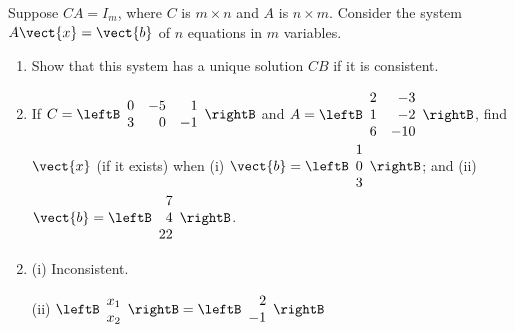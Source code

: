 \begin{multicols}{2}
\begin{ex}
\begin{sol}
\begin{enumerate}[label={\alph*.}]
\end{enumerate}
\end{sol}
\end{ex}

\begin{ex}
Suppose $CA = I_{m}$, where $C$ is $m \times n$ and $A$ is $n \times m$. Consider the system $A\vect{x} = \vect{b}$ of $n$ equations in $m$ variables.


\begin{enumerate}[label={\alph*.}]
\item Show that this system has a unique solution $CB$ if it is consistent.

\item If $C = \leftB \begin{array}{rrr}
0 & -5 & 1 \\
3 & 0 & -1
\end{array} \rightB$
 and $A = \leftB \begin{array}{rr}
 2 & -3 \\
 1 & -2 \\
 6 & -10
 \end{array} \rightB$, find $\vect{x}$ (if it exists) when 
\newline (i) $\vect{b} = \leftB \begin{array}{r}
 1 \\
 0 \\
 3
 \end{array} \rightB$; and (ii) $\vect{b} = \leftB \begin{array}{r}
 7 \\
 4 \\
 22
 \end{array} \rightB$.

\end{enumerate}
\begin{sol}
\begin{enumerate}[label={\alph*.}]

\setcounter{enumi}{1}
\item 
(i) Inconsistent.

(ii) $\leftB \begin{array}{c}
x_{1} \\
x_{2}
\end{array} \rightB = \leftB \begin{array}{r}
2 \\
-1
\end{array} \rightB$
\end{enumerate}
\end{sol}
\end{ex}


\end{multicols}
